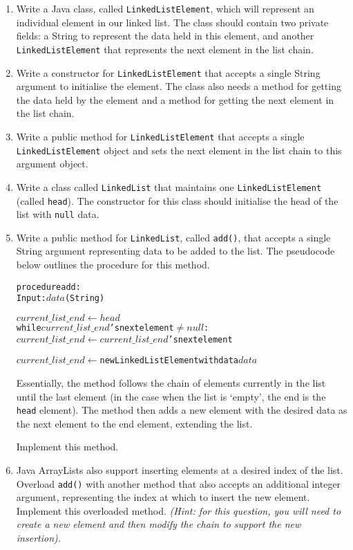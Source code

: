 \documentclass[11pt,a4paper]{report}
\begin{document}
\begin{enumerate}

    \item Write a Java class, called \texttt{LinkedListElement}, which will represent an individual element in our linked list. The class should contain two private fields: a String to represent the data held in this element, and another \texttt{LinkedListElement} that represents the next element in the list chain.

    \item Write a constructor for \texttt{LinkedListElement} that accepts a single String argument to initialise the element. The class also needs a method for getting the data held by the element and a method for getting the next element in the list chain.

    \item Write a public method for \texttt{LinkedListElement} that accepts a single \texttt{LinkedListElement} object and sets the next element in the list chain to this argument object.

    \item Write a class called \texttt{LinkedList} that maintains one \texttt{LinkedListElement} (called \texttt{head}). The constructor for this class should initialise the head of the list with \texttt{null} data.

   \item Write a public method for \texttt{LinkedList}, called \texttt{add()}, that accepts a single String argument representing data to be added to the list. The pseudocode below outlines the procedure for this method.
\begin{alltt}
procedure add:
    Input: \(data\) (String)
    
    \(current\_list\_end \gets head\)
    while \(current\_list\_end\)'s next element \(\neq null\):
        \(current\_list\_end \gets current\_list\_end\)'s next element 

    \(current\_list\_end \gets \) new LinkedListElement with data \(data\)
\end{alltt}

    Essentially, the method follows the chain of elements currently in the list until the last element (in the case when the list is `empty', the end is the \texttt{head} element). The method then adds a new element with the desired data as the next element to the end element, extending the list.

    Implement this method.

    \item Java ArrayLists also support inserting elements at a desired index of the list. Overload \texttt{add()} with another method that also accepts an additional integer argument, representing the index at which to insert the new element. Implement this overloaded method. \textit{(Hint: for this question, you will need to create a new element and then modify the chain to support the new insertion).}


\end{enumerate}
\end{document}
